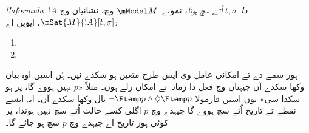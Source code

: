 \documentclass[../../../include/open-logic-section]{subfiles}
\begin{document}
\begin{defn}
  \emph{!!a{formula}~$!A$ دا~$t, \sigma$ اُتے سچ ہونا}، نمونے~$\mModel M$
  وچ، نشانیاں وچ $\mSat{M}{!A}[t, \sigma]$، ایویں اے:
  \begin{enumerate}
  \item{} 
  \item{} 
  \end{enumerate}
\end{defn}

ہور سمے دے تے امکانی عامل وی ایس طرح متعین ہو سکدے نیں۔ ہُن اسیں
اوہ بیان وکھا سکدے آں جیہناں وچ فعل دا زمانہ تے امکان رلے ہون۔
مثلاً «$p$ نہیں ہووے گا، پر ہو سکدا سی» نوں اسیں فارمولا
$\lnot \Ftemp p \land \Diamond \Ftemp p$ نال وکھا سکدے آں۔
ایہ ایسے نقطے تے تاریخ اُتے سچ ہووے گا جیہدے وچ $p$ اگلی کسے
حالت اُتے سچ نہیں ہوندا، پر کوئی ہور تاریخ اے جیہدے وچ $p$ سچ ہو جائے گا۔
\end{document}
